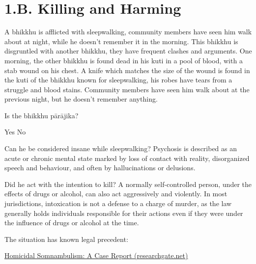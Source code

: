 \chapter{1.B. Killing and Harming}
\renewcommand*{\theChapterTitle}{1.B. Killing and Harming}

\begin{exam}{\autoExamName}

\begin{problem}

  A bhikkhu is afflicted with sleepwalking, community members have seen him walk about at night, while he doesn't remember it in the morning.
  This bhikkhu is disgruntled with another bhikkhu, they have frequent clashes and arguments.
  One morning, the other bhikkhu is found dead in his kuti in a pool of blood, with a stab wound on his chest.
  A knife which matches the size of the wound is found in the kuti of the bhikkhu known for sleepwalking, his robes have tears from a struggle and blood stains.
  Community members have seen him walk about at the previous night, but he doesn't remember anything.

  \bigskip

  Is the bhikkhu pārājika?

  \bigskip

  \begin{answers}{2}
    \bChoices
     Yes\eAns
     No\eAns
    \eChoices
  \end{answers}

  \begin{solution}
    Can he be considered insane while sleepwalking? Psychosis is described as an acute or chronic mental state marked by loss of contact with reality, disorganized speech and behaviour, and often by hallucinations or delusions.

    Did he act with the intention to kill? A normally self-controlled person, under the effects of drugs or alcohol, can also act aggressively and violently. In most jurisdictions, intoxication is not a defense to a charge of murder, as the law generally holds individuals responsible for their actions even if they were under the influence of drugs or alcohol at the time.

    The situation has known legal precedent:

    \href{https://www.researchgate.net/publication/15260363_Homicidal_Somnambulism_A_Case_Report}{Homicidal Somnambulism: A Case Report (researchgate.net)}
  \end{solution}


\end{problem}
\end{exam}
